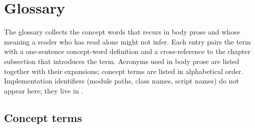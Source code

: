 
\chapter{Glossary}
\label{app:glossary}

The glossary collects the concept words that recurs in body prose and whose meaning a reader who has read  alone might not infer. Each entry pairs the term with a one-sentence concept-word definition and a cross-reference to the chapter subsection that introduces the term. Acronyms used in body prose are listed together with their expansions; concept terms are listed in alphabetical order. Implementation identifiers (module paths, class names, script names) do not appear here; they live in .

\section{Concept terms}

